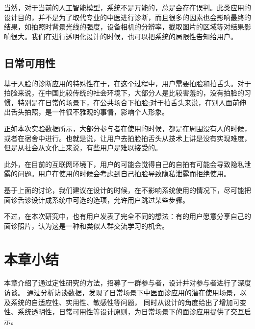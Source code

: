 当然，对于当前的人工智能模型，系统不是万能的，总是会存在误判。此类应用的设计目的，并不是为了取代专业的中医进行诊断，而且很多的因素也会影响最终的结果，如拍照时背景光线的强度，设备相机的分辨率，截取图片的区域等对结果影响很大。我们在进行透明化设计的时候，也可以把系统的局限性告知给用户。

\subsection{日常可用性}
基于人脸的诊断应用的特殊性在于，在这个过程中，用户需要拍脸和拍舌头。对于拍脸来说，在中国比较传统的社会环境下，大部分人是比较害羞的，没有拍脸的习惯，特别是在日常的场景下，在公共场合下拍脸;对于拍舌头来说，在别人面前伸出舌头拍照，是一件很不雅观的事情，影响个人形象。

正如本次实验数据所示，大部分参与者在使用的时候，都是在周围没有人的时候，或者在宿舍中进行。也就是说，让用户去拍脸拍舌头从技术上讲是没有实现难度，但是从社会从文化上来说，有些用户是难以接受的。

此外，在目前的互联网环境下，用户的可能会觉得自己的自拍有可能会导致隐私泄露的问题。用户在使用的时候会考虑到自己拍脸导致隐私泄露而拒绝使用。

基于上面的讨论，我们建议在设计的时候，在不影响系统使用的情况下，尽可能把面诊舌诊设计成系统中可选的选项，允许用户跳过某些步骤。

不过，在本次研究中，也有用户发表了完全不同的想法：有的用户愿意分享自己的面诊照片，认为这是一种和类似人群交流学习的机会。

\section{本章小结}


本章介绍了通过定性研究的方法，招募了一群参与者，设计并对参与者进行了深度访谈。
通过分析访谈数据，发现了日常场景下中医面诊应用的潜在使用场景，以及系统的自适应性、实用性、敏感性等问题，
同时从设计的角度给出了增加可变性、系统透明性，日常可用性等设计原则，为日常场景下的面诊应用提供了交互启示。










